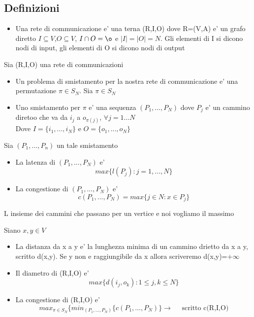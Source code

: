 \documentclass{article}
\begin{document}
        \subsection*{Definizioni}
        \begin{itemize}
          \item Una rete di communicazione e' una terna (R,I,O) dove R=(V,A) e' un grafo diretto
            $I \subseteq V$,$O\subseteq V$, $I \cap O =\o$ e $\mid I \mid =\mid O \mid=N$.
            Gli elementi di I si dicono nodi di input, gli elementi di O si dicono nodi di output
        \end{itemize}
        Sia (R,I,O) una rete di communicazioni
        \begin{itemize}
          \item Un problema di smistamento per la nostra rete di communicazione e' una permutazione $\pi \in S_N$. Sia $\pi \in S_N$
          \item Uno smistamento per $\pi$ e' una sequenza $(P_1,...,P_N)$ dove $P_j$ e' un cammino diretoo che va da $i_j$ a $o_{\pi(j)}$, $\forall j=1...N$ \\ 
            Dove $I=\{i_1,...,i_N\}$ e $O=\{o_1,...,o_N\}$
        \end{itemize}
        Sia $(P_1,...,P_n)$ un tale smistamento
        \begin{itemize}
          \item La latenza di $(P_1,...,P_N)$ e'
            \begin{equation*}
              max\{l(P_j):j=1,...,N\}
            \end{equation*}
          \item La congestione di $(P_1,...,P_N)$ e' 
            \begin{equation*}
              c(P_1,...,P_N)=max\{j\in N:x\in P_j\}
            \end{equation*}
        \end{itemize}
        \begin{flushleft}
          L insieme dei cammini che passano per un vertice e noi vogliamo il massimo
        \end{flushleft}
        Siano $x,y \in V$
        \begin{itemize}
          \item La distanza da x a y e' la lunghezza minima di un cammino drietto da x a y, scritto d(x,y). Se y non e raggiungibile da x allora scriveremo d(x,y)=$+\infty$
          \item Il diametro di (R,I,O) e'
            \begin{equation*}
              max\{d(i_j,o_k): 1\leq j,k\leq N\} 
            \end{equation*}
          \item La congestione di (R,I,O) e'
            \begin{equation*}
              max_{\pi \in S_N}\{min_{(P_1,...,P_N)}\{c(P_1,...,P_N)\} \to \quad \text{ scritto c(R,I,O)}
            \end{equation*}
        \end{itemize}




          
        


      
\end{document}
